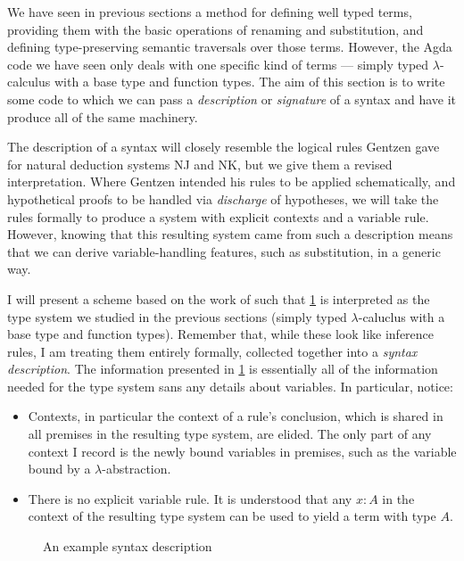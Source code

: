 We have seen in previous sections a method for defining well typed terms,
providing them with the basic operations of renaming and substitution, and
defining type-preserving semantic traversals over those terms.
However, the Agda code we have seen only deals with one specific kind of terms
--- simply typed $\lambda$-calculus with a base type and function types.
The aim of this section is to write some code to which we can pass a
\emph{description} or \emph{signature} of a syntax and have it produce all of
the same machinery.

The description of a syntax will closely resemble the logical rules Gentzen gave
for natural deduction systems NJ and NK, but we give them a revised
interpretation.
Where Gentzen intended his rules to be applied schematically, and hypothetical
proofs to be handled via \emph{discharge} of hypotheses, we will take the rules
formally to produce a system with explicit contexts and a variable rule.
However, knowing that this resulting system came from such a description means
that we can derive variable-handling features, such as substitution, in a
generic way.

I will present a scheme based on the work of \citet{AACMM21} such that
\cref{fig:app-lam} is interpreted as the type
system we studied in the previous sections (simply typed $\lambda$-caluclus with
a base type and function types).
Remember that, while these look like inference rules, I am treating them
entirely formally, collected together into a \emph{syntax description}.
The information presented in \cref{fig:app-lam} is essentially all of the
information needed for the type system sans any details about variables.
In particular, notice:
\begin{itemize}
  \item Contexts, in particular the context of a rule's conclusion, which is
    shared in all premises in the resulting type system, are elided.
    The only part of any context I record is the newly bound variables in
    premises, such as the variable bound by a $\lambda$-abstraction.
  \item There is no explicit variable rule.
    It is understood that any $x : A$ in the context of the resulting type
    system can be used to yield a term with type $A$.
\end{itemize}

\begin{figure}
  \caption{An example syntax description}
  \label{fig:app-lam}
\end{figure}


